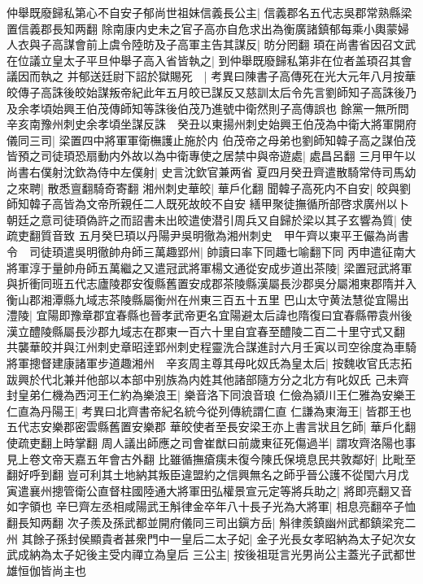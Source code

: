 仲舉既廢歸私第心不自安子郁尚世祖妹信義長公主|{
	信義郡名五代志吳郡常熟縣梁置信義郡長知两翻}
除南康内史未之官子高亦自危求出為衡廣諸鎮郁每乘小輿蒙婦人衣與子高謀會前上虞令陸昉及子高軍主告其謀反|{
	昉分罔翻}
頊在尚書省因召文武在位議立皇太子平旦仲舉子高入省皆執之|{
	到仲舉既廢歸私第非在位者盖頊召其會議因而執之}
并郁送廷尉下詔於獄賜死　|{
	考異曰陳書子高傳死在光大元年八月按華皎傳子高誅後皎始謀叛帝紀此年五月皎已謀反又慈訓太后令先言劉師知子高誅後乃及余孝頃始興王伯茂傳師知等誅後伯茂乃進號中衛然則子高傳誤也}
餘黨一無所問　辛亥南豫州刺史余孝頃坐謀反誅　癸丑以東揚州刺史始興王伯茂為中衛大將軍開府儀同三司|{
	梁置四中將軍軍衛橅護止施於内}
伯茂帝之母弟也劉師知韓子高之謀伯茂皆預之司徒頊恐扇動内外故以為中衛專使之居禁中與帝遊處|{
	處昌呂翻}
三月甲午以尚書右僕射沈欽為侍中左僕射|{
	史言沈欽官兼两省}
夏四月癸丑齊遣散騎常侍司馬幼之來聘|{
	散悉亶翻騎奇寄翻}
湘州刺史華皎|{
	華戶化翻}
聞韓子高死内不自安|{
	皎與劉師知韓子高皆為文帝所親任二人既死故皎不自安}
繕甲聚徒撫循所部啓求廣州以卜朝廷之意司徒頊偽許之而詔書未出皎遣使潜引周兵又自歸於梁以其子玄響為質|{
	使疏吏翻質音致}
五月癸巳頊以丹陽尹吳明徹為湘州刺史　甲午齊以東平王儼為尚書令　司徒頊遣吳明徹帥舟師三萬趣郢州|{
	帥讀曰率下同趣七喻翻下同}
丙申遣征南大將軍淳于量帥舟師五萬繼之又遣冠武將軍楊文通從安成步道出茶陵|{
	梁置冠武將軍與折衝同班五代志廬陵郡安復縣舊置安成郡茶陵縣漢屬長沙郡吳分屬湘東郡隋并入衡山郡湘潭縣九域志茶陵縣屬衡州在州東三百五十五里}
巴山太守黄法慧從宜陽出澧陵|{
	宜陽即豫章郡宜春縣也晉孝武帝更名宜陽避太后諱也隋復曰宜春縣帶袁州後漢立醴陵縣屬長沙郡九域志在郡東一百六十里自宜春至醴陵二百二十里守式又翻}
共襲華皎并與江州刺史章昭逹郢州刺史程靈洗合謀進討六月壬寅以司空徐度為車騎將軍摠督建康諸軍步道趣湘州　辛亥周主尊其母叱奴氏為皇太后|{
	按魏收官氏志拓跋興於代北兼并他部以本部中别族為内姓其他諸部隨方分之北方有叱奴氏}
己未齊封皇弟仁機為西河王仁約為樂浪王|{
	樂音洛下同浪音琅}
仁儉為潁川王仁雅為安樂王仁直為丹陽王|{
	考異曰北齊書帝紀名統今從列傳統謂仁直}
仁謙為東海王|{
	皆郡王也五代志安樂郡密雲縣舊置安樂郡}
華皎使者至長安梁王亦上書言狀且乞師|{
	華戶化翻使疏吏翻上時掌翻}
周人議出師應之司會崔猷曰前歲東征死傷過半|{
	謂攻齊洛陽也事見上卷文帝天嘉五年會古外翻}
比雖循撫瘡痍未復今陳氏保境息民共敦鄰好|{
	比毗至翻好呼到翻}
豈可利其土地納其叛臣違盟約之信興無名之師乎晉公護不從閠六月戊寅遣襄州摠管衛公直督柱國陸通大將軍田弘權景宣元定等將兵助之|{
	將即亮翻又音如字領也}
辛巳齊左丞相咸陽武王斛律金卒年八十長子光為大將軍|{
	相息亮翻卒子恤翻長知两翻}
次子羨及孫武都並開府儀同三司出鎭方岳|{
	斛律羨鎮幽州武都鎮梁兖二州}
其餘子孫封侯顯貴者甚衆門中一皇后二太子妃|{
	金子光長女孝昭納為太子妃次女武成納為太子妃後主受内禪立為皇后}
三公主|{
	按後祖珽言光男尚公主蓋光子武都世雄恒伽皆尚主也}
